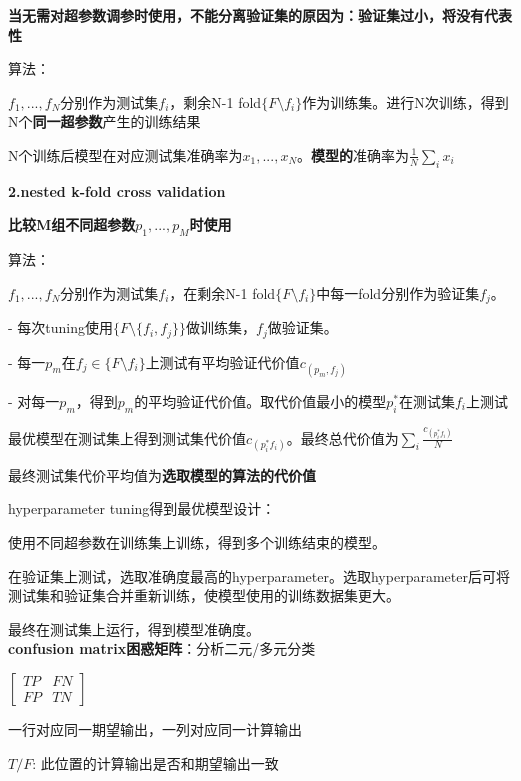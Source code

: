 \documentclass[UTF8]{ctexart}
\begin{document}
  \quad \quad \textbf{当无需对超参数调参时使用，不能分离验证集的原因为：验证集过小，将没有代表性}

  \quad \quad 算法：

  \quad \quad \quad $f_1, ..., f_N$分别作为测试集$f_i$，剩余N-1 fold$\{F\setminus f_i\}$作为训练集。进行N次训练，得到N个\textbf{同一超参数}产生的训练结果
  
  \quad \quad \quad N个训练后模型在对应测试集准确率为${x_1, ..., x_N}$。\textbf{模型的}准确率为$\frac{1}{N}\sum_ix_i$

  \quad \textbf{2.nested k-fold cross validation}

  \quad \quad \textbf{比较M组不同超参数$p_1, ..., p_M$时使用}

  \quad \quad 算法：
  
  \quad \quad \quad $f_1, ..., f_N$分别作为测试集$f_i$，在剩余N-1 fold$\{F\setminus f_i\}$中每一fold分别作为验证集$f_j$。

  \quad \quad \quad - 每次tuning使用$\{F\setminus \{f_i, f_j\}\}$做训练集，$f_j$做验证集。

  \quad \quad \quad - 每一$p_m$在$f_j \in \{F \setminus f_i\}$上测试有平均验证代价值$c_{(p_m, f_j)}$

  \quad \quad \quad - 对每一$p_m$，得到$p_m$的平均验证代价值。取代价值最小的模型$p^*_i$在测试集$f_i$上测试

  \quad \quad \quad 最优模型在测试集上得到测试集代价值$c_{(p^*_i f_i)}$。最终总代价值为$\sum_i\frac{c_{(p^*_i f_i)} }{N}$

  \quad \quad \quad 最终测试集代价平均值为\textbf{选取模型的算法的代价值}

  hyperparameter tuning得到最优模型设计：
  
  \quad 使用不同超参数在训练集上训练，得到多个训练结束的模型。
  
  \quad 在验证集上测试，选取准确度最高的hyperparameter。选取hyperparameter后可将测试集和验证集合并重新训练，使模型使用的训练数据集更大。
  
  \quad 最终在测试集上运行，得到模型准确度。\\
\textbf{confusion matrix困惑矩阵}：分析二元/多元分类
  
  $\begin{bmatrix}
    TP & FN \\
    FP & TN
  \end{bmatrix}$

  一行对应同一期望输出，一列对应同一计算输出

  $T/F$: 此位置的计算输出是否和期望输出一致
\end{document}
